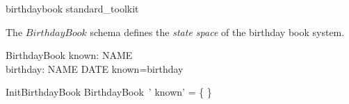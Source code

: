 \begin{zsection}
  \SECTION birthdaybook \parents standard\_toolkit
\end{zsection}

\begin{zed}
\end{zed}

The $BirthdayBook$ schema defines the \emph{state space} of 
the birthday book system. 

\begin{schema}{BirthdayBook}
    known: \power NAME \\
    birthday: NAME \pfun DATE
\where
    known=\dom birthday
\end{schema}

\begin{schema}{InitBirthdayBook}
    BirthdayBook~'
\where
    known' = \{ \}
\end{schema}
